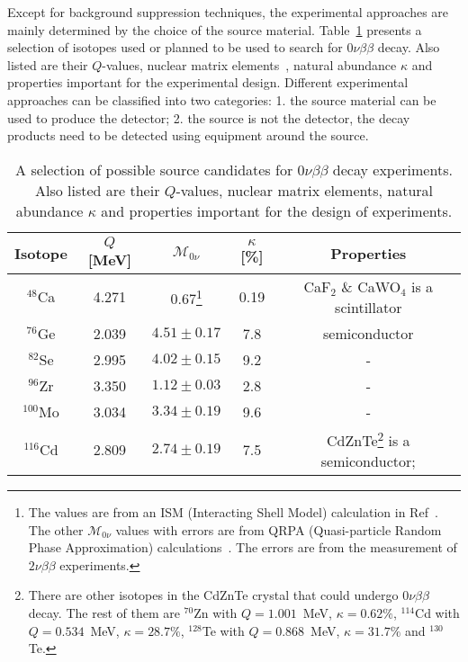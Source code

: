 Except for background suppression techniques, the experimental approaches are mainly determined by the choice of the source material. Table~\ref{tab:gerda:iso} presents a selection of isotopes used or planned to be used to search for $0\nu\beta\beta$ decay. Also listed are their $Q$-values, nuclear matrix elements~\cite{Mut90, Rod07, Sim08, Cau08}, natural abundance $\kappa$ and properties important for the experimental design. Different experimental approaches can be classified into two categories: 1. the source material can be used to produce the detector; 2. the source is not the detector, the decay products need to be detected using equipment around the source.
\begin{table}[htbp]
  \centering
  \caption{A selection of possible source candidates for         $0\nu\beta\beta$ decay experiments. Also listed are their $Q$-values,     nuclear matrix elements, natural abundance $\kappa$ and properties     important for the design of experiments.}
  \label{tab:gerda:iso}
  \begin{minipage}{\linewidth}
    \begin{tabular}{ccccc} \hline Isotope & $Q$ [MeV] &       $\mathcal{M}_{0\nu}$ & $\kappa$ [\%] & Properties \\\hline       $^{48}$Ca & 4.271 & 0.67\footnote{The values are from an ISM         (Interacting Shell Model) calculation in Ref~\cite{Cau08}.         The other $\mathcal{M}_{0\nu}$ values with errors are from         QRPA (Quasi-particle Random Phase Approximation)         calculations~\cite{Rod07}. The errors are from the measurement         of $2\nu\beta\beta$ experiments.} & 0.19 & CaF$_{2}$ \&       CaWO$_{4}$ is a scintillator \\
      $^{76}$Ge & 2.039 & $4.51 \pm 0.17$ & 7.8 & semiconductor \\
      $^{82}$Se & 2.995 & $4.02 \pm 0.15$ & 9.2 & - \\
      $^{96}$Zr & 3.350 & $1.12 \pm 0.03$ & 2.8 & - \\
      $^{100}$Mo & 3.034 & $3.34 \pm 0.19$ & 9.6 & - \\
      $^{116}$Cd & 2.809 & $2.74 \pm 0.19$ & 7.5 &       CdZnTe\footnote{There are other isotopes in the CdZnTe crystal         that could undergo $0\nu\beta\beta$ decay. The rest of them         are $^{70}$Zn with $Q = 1.001$~MeV, $\kappa = 0.62\%$,         $^{114}$Cd with $Q = 0.534$~MeV, $\kappa = 28.7\%$, $^{128}$Te         with $Q = 0.868$~MeV, $\kappa = 31.7\%$ and $^{130}$Te.} is a       semiconductor;\\

\end{tabular}
\end{minipage}
\end{table}
